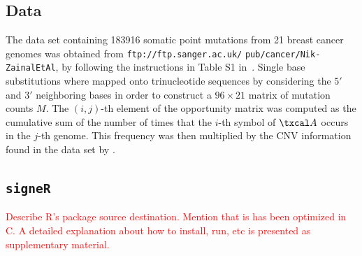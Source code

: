 \documentclass{bioinfo}
\newcommand{\CC}{C\nolinebreak\hspace{-.05em}\raisebox{.4ex}{\tiny\bf
    +}\nolinebreak\hspace{-.10em}\raisebox{.4ex}{\tiny\bf +}}
\begin{document}
\subsection{Data} The data set containing 183916 somatic point
mutations from 21 breast cancer genomes was obtained from
\verb+ftp://ftp.sanger.ac.uk/+ \verb+pub/cancer/Nik-ZainalEtAl+, by
following the instructions in Table S1 in~\cite{NCell}. Single base 
substitutions where mapped onto trinucleotide sequences by considering
the $5'$ and $3'$ neighboring bases in order to construct a $96\times
21$ matrix of mutation counts $M$. 
The $(i,j)$-th element of the opportunity matrix was computed as the
cumulative sum of the number of times that the $i$-th symbol of
$\txcal A$ occurs in the $j$-th genome. This frequency was then
multiplied by the CNV information found in the data set by
\cite{NCell}.



\subsection{\texttt{signeR}} \textcolor{red}{Describe R's package 
source destination. Mention that is has been optimized in
\CC. A detailed explanation about how to install, run, etc is 
presented as supplementary material.}
\end{document}
